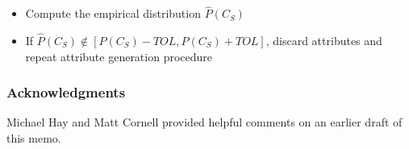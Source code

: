 \documentclass[11pt]{article}
\begin{document}
{\begin{itemize}
\begin{itemize}
	\end{itemize}
	\begin{itemize}
	\item Update the values of each T attribute: for $l$ in $k$
		\begin{itemize}
		\item For each object $T_j$
			\begin{itemize}
			\item Update the value of attribute $l$ for object $B_j$
			by computing a probability estimate with CPD 
			$P_{A^l_T|G}$ and then randomly assigning a value 
			according to the estimate
			\end{itemize}
		\end{itemize}
	\end{itemize}
\item Compute the empirical distribution $\hat{P}(C_S)$  
\item If $\hat{P}(C_S) \notin [P(C_S)-TOL,P(C_S)+TOL]$, discard attributes and repeat attribute generation procedure  
\end{itemize}
}

\vspace{-2.mm}
\subsubsection*{Acknowledgments}
\vspace{-4.mm}
Michael Hay and Matt Cornell provided helpful comments on an earlier draft of this memo.

\vspace{-2.mm}
{\small
\renewcommand\refname{\normalsize{References}}


}
\end{document}
